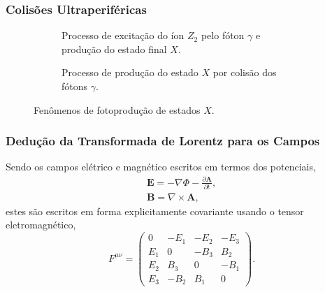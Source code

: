 \documentclass[xcolor=dvipsnames]{beamer}
\renewcommand{\vec}{\mathbf}
\begin{document}
\begin{frame}
	\frametitle{Colisões Ultraperiféricas}
	\begin{figure}
		\begin{subfigure}[b]{0.45\textwidth}
			\centering
			
			\caption{Processo de excitação do íon $Z_2$ pelo fóton $\gamma$ e
			produção do estado final $X$.}
		\end{subfigure}
		\hspace{0.25cm}
		\begin{subfigure}[b]{0.45\textwidth}
			\centering
			
			\caption{Processo de produção do estado $X$ por colisão dos fótons $\gamma$.}
		\end{subfigure}
		\caption{Fenômenos de fotoprodução de estados $X$.}
	\end{figure}

\end{frame}

\appendix

\begin{frame}
	\frametitle{Dedução da Transformada de Lorentz para os Campos}
	Sendo os campos elétrico e magnético escritos em termos dos potenciais,
	\begin{gather}
		\vec{E} = - \nabla \Phi - \frac{\partial \vec{A}}{\partial t}, \\
		\vec{B} = \nabla \times \vec{A},
	\end{gather}
	estes são escritos em forma explicitamente covariante usando o tensor
	eletromagnético,
	\begin{equation}
		F^{\mu \nu} = \begin{pmatrix}
			0 & -E_1 & -E_2 & -E_3 \\
			E_1 & 0 & -B_3 & B_2 \\
			E_2 & B_3 & 0 & -B_1 \\
			E_3 & -B_2 & B_1 & 0
		\end{pmatrix}.
	\end{equation}
\end{frame}
\end{document}
